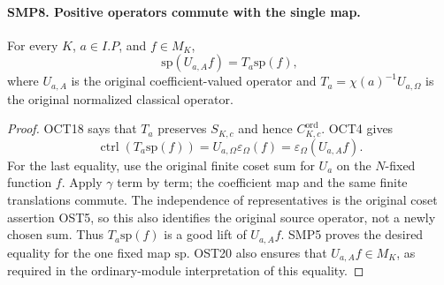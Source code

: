 \paragraph{SMP8. Positive operators commute with the single map.}
\label{claim:SMP8}
For every $K$, $a\in I.P$, and $f\in M_K$,
\[
       \mathrm{sp}(U_{a,A}f)=T_a\mathrm{sp}(f),
\]
where $U_{a,A}$ is the original coefficient-valued
operator and $T_a=\chi(a)^{-1}U_{a,\Omega}$ is the
original normalized classical operator.
\begin{proof}
OCT18 says that $T_a$ preserves $S_{K,c}$ and hence
$C^{\mathrm{ord}}_{K,c}$.  OCT4 gives
\[
 \operatorname{ctrl}(T_a\mathrm{sp}(f))
     =U_{a,\Omega}\varepsilon_\Omega(f)
     =\varepsilon_\Omega(U_{a,A}f).
\]
For the last equality, use the original finite coset
sum for $U_a$ on the $N$-fixed function $f$.  Apply
$\gamma$ term by term; the coefficient map and the
same finite translations commute.  The independence
of representatives is the original coset assertion
OST5, so this also identifies the original source
operator, not a newly chosen sum.  Thus
$T_a\mathrm{sp}(f)$ is a good lift of $U_{a,A}f$.
SMP5 proves the desired equality for the one fixed
map $\mathrm{sp}$.  OST20 also ensures that
$U_{a,A}f\in M_K$, as required in the ordinary-module
interpretation of this equality.
\end{proof}

